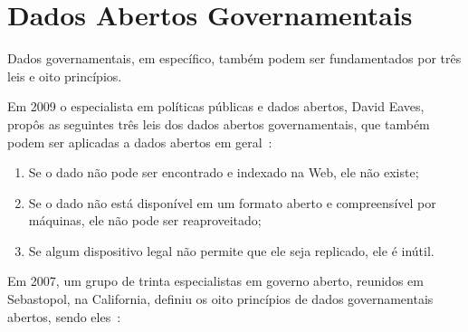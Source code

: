 \section{Dados Abertos Governamentais}
Dados governamentais, em específico, também podem ser fundamentados por três leis e oito princípios.

Em 2009 o especialista em políticas públicas e dados abertos, David Eaves, propôs as seguintes três leis dos dados abertos governamentais, que também podem ser aplicadas a dados abertos em geral~\cite{eaveslaws}:

\begin{enumerate}
\item Se o dado não pode ser encontrado e indexado na Web, ele não existe;

\item Se o dado não está disponível em um formato aberto e compreensível por máquinas, ele não pode ser reaproveitado;

\item Se algum dispositivo legal não permite que ele seja replicado, ele é inútil.

\end{enumerate}

Em 2007, um grupo de trinta especialistas em governo aberto, reunidos em Sebastopol, na California, definiu os oito princípios de dados governamentais abertos, sendo eles~\cite{opengovdata}:

